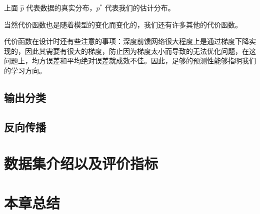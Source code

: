 上面 $ \hat{p} $ 代表数据的真实分布，$ p^{\ast} $ 代表我们的估计分布。

当然代价函数也是随着模型的变化而变化的，我们还有许多其他的代价函数。

代价函数在设计时还有些注意的事项：深度前馈网络很大程度上是通过梯度下降实现的，因此其需要有很大的梯度，防止因为梯度太小而导致的无法优化问题，在这问题上，均方误差和平均绝对误差就成效不佳。因此，足够的预测性能够指明我们的学习方向。


\subsection{输出分类}


\subsection{反向传播}

\section{数据集介绍以及评价指标}

\section{本章总结}
